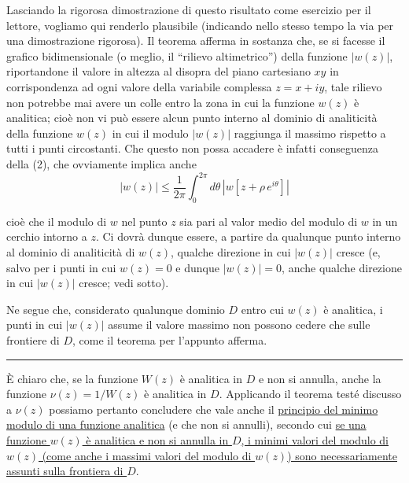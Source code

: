 \documentclass[11pt, a4paper]{book}
\numberwithin{equation}{section}
\begin{document}
Lasciando la rigorosa dimostrazione di questo risultato come esercizio per il lettore, vogliamo qui renderlo plausibile (indicando nello stesso tempo la via per una dimostrazione rigorosa). Il teorema afferma in sostanza che, se si facesse il grafico bidimensionale (o meglio, il ``rilievo altimetrico'') della funzione $|w(z)|$, riportandone il valore in altezza al disopra del piano cartesiano $xy$ in corrispondenza ad ogni valore della variabile complessa $z = x + iy$, tale rilievo non potrebbe mai avere un colle entro la zona in cui la funzione $w(z)$ è analitica; cioè non vi può essere alcun punto interno al dominio di analiticità della funzione $w(z)$ in cui il modulo $|w(z)|$ raggiunga il massimo rispetto a tutti i punti circostanti. Che questo non possa accadere è infatti conseguenza della (2), che ovviamente implica anche
\[
|w(z)| \leq \frac{1}{2\pi} \int_0^{2\pi} d\theta\, \left|w\!\left[z + \rho\, e^{i\theta}\right]\right|
\]


cioè che il modulo di $w$ nel punto $z$ sia pari al valor medio del modulo di $w$ in un cerchio intorno a $z$. Ci dovrà dunque essere, a partire da qualunque punto interno al dominio di analiticità di $w(z)$, qualche direzione in cui $|w(z)|$ cresce (e, salvo per i punti in cui $w(z) = 0$ e dunque $|w(z)| = 0$, anche qualche direzione in cui $|w(z)|$ cresce; vedi sotto).

Ne segue che, considerato qualunque dominio $D$ entro cui $w(z)$ è analitica, i punti in cui $|w(z)|$ assume il valore massimo non possono cedere che sulle frontiere di $D$, come il teorema per l'appunto afferma.

\medskip\hrule\medskip

È chiaro che, se la funzione $W(z)$ è analitica in $D$ e non si annulla, anche la funzione $\nu(z) = 1/W(z)$ è analitica in $D$. Applicando il teorema testé discusso a $\nu(z)$ possiamo pertanto concludere che vale anche il \uline{principio del minimo modulo di una funzione analitica} (e che non si annulli), secondo cui \uline{se una funzione $w(z)$ è analitica e non si annulla in $D$, i minimi valori del modulo di $w(z)$ (come anche i massimi valori del modulo di $w(z)$) sono necessariamente assunti sulla frontiera di $D$}.
\end{document}
